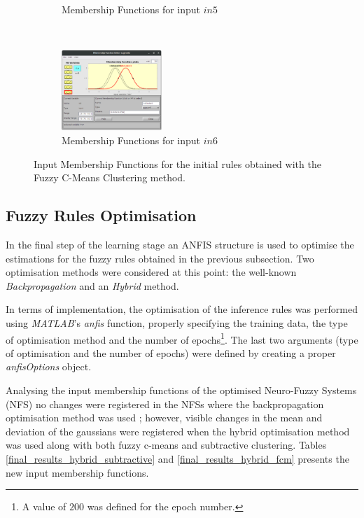 \documentclass[11pt]{article}
\begin{document}
\begin{figure}[ht]
\begin{subfigure}[t]{0.3\textwidth}
		\caption{Membership Functions for input $in5$}
	\end{subfigure}
	~
	\begin{subfigure}[t]{0.3\textwidth}
		\centering
		\includegraphics[height=1.2in]{images/fcm_in6}
		\caption{Membership Functions for input $in6$}
	\end{subfigure}
	\caption{Input Membership Functions for the initial rules obtained with the Fuzzy C-Means Clustering method.}
\end{figure}

\subsection{Fuzzy Rules Optimisation}

In the final step of the learning stage an ANFIS structure is used to optimise the estimations for the fuzzy rules obtained in the previous subsection. Two optimisation methods were considered at this point: the well-known \emph{Backpropagation} and an \emph{Hybrid} method.

In terms of implementation, the optimisation of the inference rules was performed using \emph{MATLAB}'s \emph{anfis} function, properly specifying the training data, the type of optimisation method and the number of epochs\footnote{A value of $200$ was defined for the epoch number.}. The last two arguments (type of optimisation and the number of epochs) were defined by creating a proper \emph{anfisOptions} object.

Analysing the input membership functions of the optimised Neuro-Fuzzy Systems (NFS) no changes were registered in the NFSs where the backpropagation optimisation method was used ; however, visible changes in the mean and deviation of the gaussians were registered when the hybrid optimisation method was used along with both fuzzy c-means and subtractive clustering. Tables \ref{final_results_hybrid_subtractive}  and \ref{final_results_hybrid_fcm} presents the new input membership functions.

\pagebreak
\end{document}
